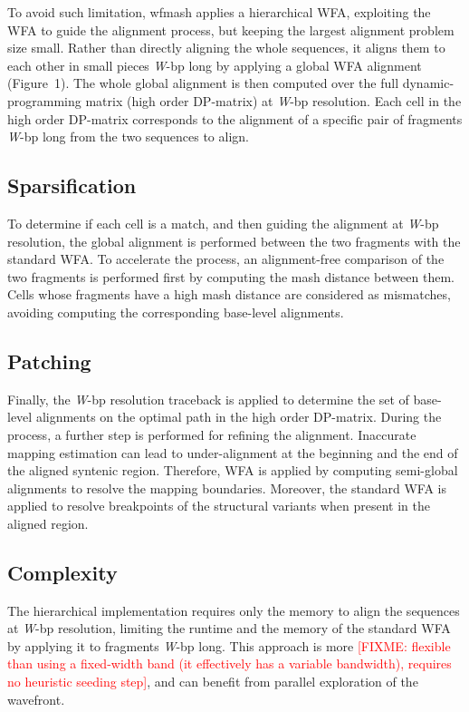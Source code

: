 \documentclass{bioinfo}
\theoremstyle{definition}
\newcommand{\red}[1]{{\textcolor{Red}{#1}}}
\newcommand{\FIXME}[1]{\red{[FIXME: #1]}}
\begin{document}
To avoid such limitation, wfmash applies a hierarchical WFA, exploiting the WFA to guide the alignment process, but keeping the largest alignment problem size small.
Rather than directly aligning the whole sequences, it aligns them to each other in small pieces \textit{W}-bp long by applying a global WFA alignment (Figure~1\vphantom{\ref{fig:1}}).
The whole global alignment is then computed over the full dynamic-programming matrix (high order DP-matrix) at \textit{W}-bp resolution.
Each cell in the high order DP-matrix corresponds to the alignment of a specific pair of fragments \textit{W}-bp long from the two sequences to align.

\subsection{Sparsification}
To determine if each cell is a match, and then guiding the alignment at \textit{W}-bp resolution, the global alignment is performed between the two fragments with the standard WFA.
To accelerate the process, an alignment-free comparison of the two fragments is performed first by computing the mash distance between them.
Cells whose fragments have a high mash distance are considered as mismatches, avoiding computing the corresponding base-level alignments.

\subsection{Patching}
Finally, the \textit{W}-bp resolution traceback is applied to determine the set of base-level alignments on the optimal path in the high order DP-matrix.
During the process, a further step is performed for refining the alignment.
Inaccurate mapping estimation can lead to under-alignment at the beginning and the end of the aligned syntenic region.
Therefore, WFA is applied by computing semi-global alignments to resolve the mapping boundaries.
Moreover, the standard WFA is applied to resolve breakpoints of the structural variants when present in the aligned region.

\subsection{Complexity}
The hierarchical implementation requires only the memory to align the sequences at \textit{W}-bp resolution, limiting the runtime and the memory of the standard WFA by applying it to fragments \textit{W}-bp long.
This approach is more \FIXME{flexible than using a fixed-width band (it effectively has a variable bandwidth), requires no heuristic seeding step}, and can benefit from parallel exploration of the wavefront.
\\
\end{document}
